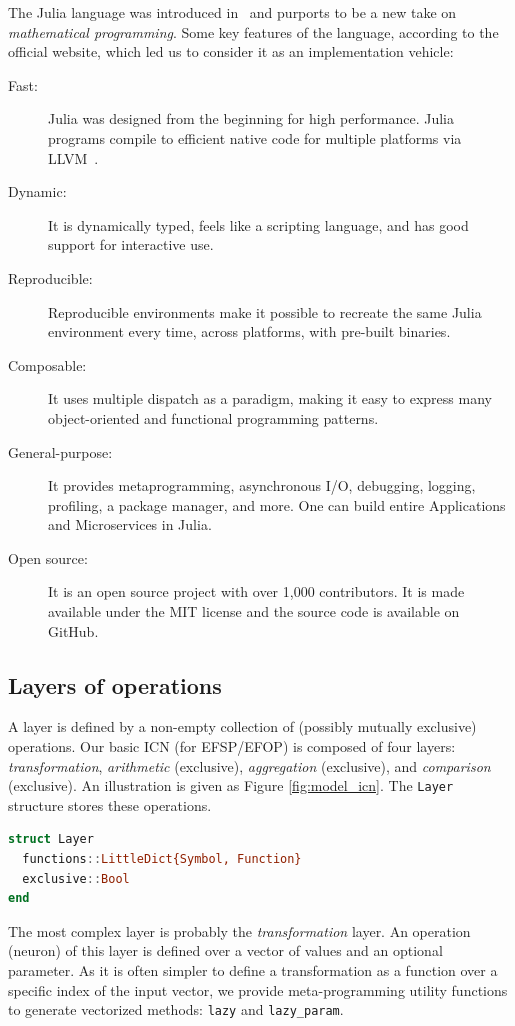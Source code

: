 \documentclass{juliacon}
\newcommand{\efsp}{\textsc{EFSP}\xspace}
\newcommand{\efop}{\textsc{EFOP}\xspace}
\begin{document}
The Julia language was introduced in~\cite{bezanson2017julia} and
purports to be a new take on \emph{mathematical programming}.  Some
key features of the language, according to the official website, which
led us to consider it as an implementation vehicle:
\begin{description}
\item[Fast:] Julia was designed from the beginning for high
  performance.  Julia programs compile to efficient native code for
  multiple platforms via LLVM~\cite{lattner2004llvm}.
\item[Dynamic:] It is dynamically typed, feels like a scripting
  language, and has good support for interactive use.
\item[Reproducible:] Reproducible environments make it possible to
  recreate the same Julia environment every time, across platforms,
  with pre-built binaries.
\item[Composable:] It uses multiple dispatch as a paradigm, making it
  easy to express many object-oriented and functional programming
  patterns.
\item[General-purpose:] It provides metaprogramming, asynchronous I/O,
  debugging, logging, profiling, a package manager, and more.  One can
  build entire Applications and Microservices in Julia.
\item[Open source:] It is an open source project with over 1,000
  contributors.  It is made available under the MIT license and the
  source code is available on GitHub.
\end{description}

\subsection{Layers of operations}
\label{subsec:layers}

A layer is defined by a non-empty collection of (possibly mutually exclusive) operations. Our basic ICN (for \efsp/\efop) is composed of four layers: \emph{transformation}, \emph{arithmetic} (exclusive), \emph{aggregation} (exclusive), and \emph{comparison} (exclusive). An illustration is given as Figure \ref{fig:model_icn}. The \texttt{Layer} structure stores these operations.

\begin{lstlisting}[language = Julia]
struct Layer
  functions::LittleDict{Symbol, Function}
  exclusive::Bool
end
\end{lstlisting}

The most complex layer is probably the \emph{transformation} layer. An operation (neuron) of this layer is defined over a vector of values and an optional parameter. As it is often simpler to define a transformation as a function over a specific index of the input vector, we provide meta-programming utility functions to generate vectorized methods: \texttt{lazy} and \texttt{lazy\_param}.
\end{document}
